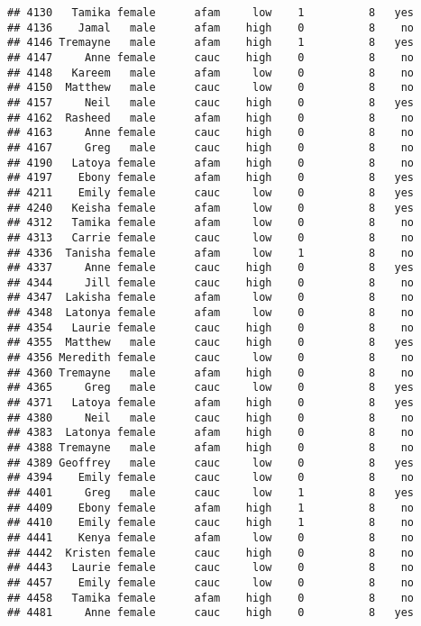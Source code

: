 \documentclass[
]{article}
\begin{document}
\begin{verbatim}
## 4130   Tamika female      afam     low    1          8   yes
## 4136    Jamal   male      afam    high    0          8    no
## 4146 Tremayne   male      afam    high    1          8   yes
## 4147     Anne female      cauc    high    0          8    no
## 4148   Kareem   male      afam     low    0          8    no
## 4150  Matthew   male      cauc     low    0          8    no
## 4157     Neil   male      cauc    high    0          8   yes
## 4162  Rasheed   male      afam    high    0          8    no
## 4163     Anne female      cauc    high    0          8    no
## 4167     Greg   male      cauc    high    0          8    no
## 4190   Latoya female      afam    high    0          8    no
## 4197    Ebony female      afam    high    0          8   yes
## 4211    Emily female      cauc     low    0          8   yes
## 4240   Keisha female      afam     low    0          8   yes
## 4312   Tamika female      afam     low    0          8    no
## 4313   Carrie female      cauc     low    0          8    no
## 4336  Tanisha female      afam     low    1          8    no
## 4337     Anne female      cauc    high    0          8   yes
## 4344     Jill female      cauc    high    0          8    no
## 4347  Lakisha female      afam     low    0          8    no
## 4348  Latonya female      afam     low    0          8    no
## 4354   Laurie female      cauc    high    0          8    no
## 4355  Matthew   male      cauc    high    0          8   yes
## 4356 Meredith female      cauc     low    0          8    no
## 4360 Tremayne   male      afam    high    0          8    no
## 4365     Greg   male      cauc     low    0          8   yes
## 4371   Latoya female      afam    high    0          8   yes
## 4380     Neil   male      cauc    high    0          8    no
## 4383  Latonya female      afam    high    0          8    no
## 4388 Tremayne   male      afam    high    0          8    no
## 4389 Geoffrey   male      cauc     low    0          8   yes
## 4394    Emily female      cauc     low    0          8    no
## 4401     Greg   male      cauc     low    1          8   yes
## 4409    Ebony female      afam    high    1          8    no
## 4410    Emily female      cauc    high    1          8    no
## 4441    Kenya female      afam     low    0          8    no
## 4442  Kristen female      cauc    high    0          8    no
## 4443   Laurie female      cauc     low    0          8    no
## 4457    Emily female      cauc     low    0          8    no
## 4458   Tamika female      afam    high    0          8    no
## 4481     Anne female      cauc    high    0          8   yes

\end{verbatim}
\end{document}
